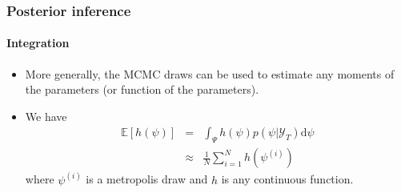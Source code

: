 \documentclass[10pt,slidestop]{beamer}
\newcommand{\sample}{\mathcal Y_T}
\begin{document}
\begin{frame}
  \frametitle{Posterior inference}
  \framesubtitle{Integration}

  \begin{itemize}

    \item More generally, the MCMC draws can be used to estimate any moments
    of the parameters (or function of the parameters).

    \bigskip

    \item We have
    \begin{eqnarray*}
        \mathbb E\left[h(\psi)\right] &=&
\int_{\Psi}h(\psi)p(\psi|\sample)\mathrm d\psi\\
        &\approx& \frac{1}{N}\sum_{i=1}^Nh\left(\psi^{(i)}\right)
    \end{eqnarray*}
    where $\psi^{(i)}$ is a metropolis draw and $h$ is any continuous function.
  \end{itemize}
\end{frame}
\end{document}
